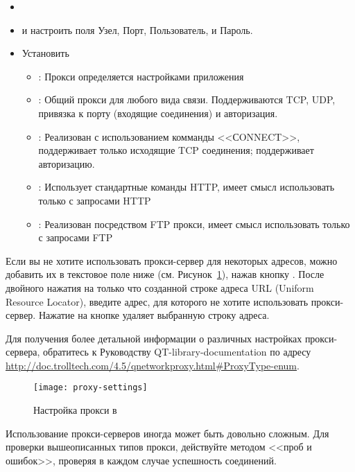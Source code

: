 \begin{itemize}
\item {}
\item {} и
настроить поля Узел, Порт, Пользователь, и Пароль.
\item Установить 
 \begin{itemize}
  \item {}: Прокси определяется настройками
  приложения
  \item {}: Общий прокси для любого вида связи.
  Поддерживаются TCP, UDP, привязка к порту (входящие соединения) и
  авторизация.
  \item {}: Реализован с использованием комманды
  <<СONNECT>>, поддерживает только исходящие TCP соединения; поддерживает
  авторизацию.
  \item {}: Использует стандартные команды
  HTTP, имеет смысл использовать только с запросами HTTP
  \item {}: Реализован посредством FTP прокси,
  имеет смысл использовать только с запросами FTP
 \end{itemize}
\end{itemize}

Если вы не хотите использовать прокси-сервер для некоторых адресов, можно
добавить их в текстовое поле ниже (см. Рисунок~\ref{fig:proxy-settings}),
нажав кнопку . После двойного нажатия на только что
созданной строке адреса URL (Uniform Resource Locator), введите адрес,
для которого не хотите использовать прокси-сервер. Нажатие на кнопке
 удаляет выбранную строку адреса.

Для получения более детальной информации о различных настройках прокси-сервера,
обратитесь к Руководству QT-library-documentation по адресу \\
\url{http://doc.trolltech.com/4.5/qnetworkproxy.html#ProxyType-enum}.

\begin{figure}[ht]
   \centering
   \texttt{[image: proxy-settings]}
   \caption{Настройка прокси в \qg \wincaption}
   \label{fig:proxy-settings}
\end{figure}

\begin{Tip} \caption{\textsc{Использование прокси-серверов}}
Использование прокси-серверов иногда может быть довольно сложным. Для
проверки вышеописанных типов прокси, действуйте методом <<проб и ошибок>>,
проверяя в каждом случае успешность соединений.
\end{Tip}


